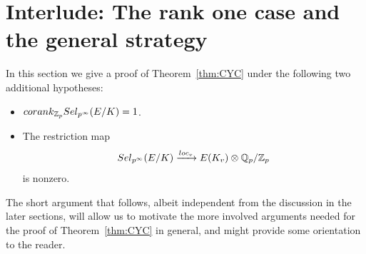 \documentclass[a4paper,10pt]{amsart}
\numberwithin{equation}{section}
\numberwithin{equation}{section}
\theoremstyle{plain}
\theoremstyle{definition}
\theoremstyle{definition}
\theoremstyle{plain}
\theoremstyle{plain}
\theoremstyle{plain}
\theoremstyle{plain}
\newcommand\SmallMatrix[1]{{%
  \tiny\arraycolsep=0.3\arraycolsep\ensuremath{\begin{pmatrix}#1\end{pmatrix}}}}
\newcommand{\Z}{\mathbb{Z}}
\newcommand{\Q}{\mathbb{Q}}
\newcommand{\rH}{\mathrm{H}}
\begin{document}



\section{Interlude: The rank one case and the general strategy}\label{sec:one}

In this section we give a proof of %
Theorem~\ref{thm:CYC} %
under the following two additional hypotheses:
\begin{itemize}
\item[(a)] ${\rm corank}_{\Z_p}{\rm Sel}_{p^\infty}(E/K)=1$.
\item[(b)] The restriction map
\[
{\rm Sel}_{p^\infty}(E/K)\xrightarrow{{\rm loc}_v}E(K_v)\otimes\Q_p/\Z_p
\]
is nonzero.
\end{itemize}
%
%
 
The short argument that follows, albeit independent from the discussion in the later sections, will allow us to motivate the more involved arguments needed for the proof of Theorem~\ref{thm:CYC} in general, and might provide some orientation to the reader.   
\end{document}
